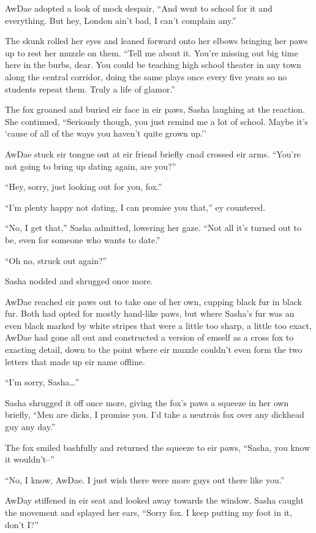 AwDae adopted a look of mock despair, ``And went to school for it and everything.  But hey, London ain't bad, I can't complain any.''

The skunk rolled her eyes and leaned forward onto her elbows bringing her paws up to rest her muzzle on them.  ``Tell me about it.  You're missing out big time here in the burbs, dear.  You could be teaching high school theater in any town along the central corridor, doing the same plays once every five years so no students repeat them.  Truly a life of glamor.''

The fox groaned and buried eir face in eir paws, Sasha laughing at the reaction.  She continued, ``Seriously though, you just remind me a lot of school.  Maybe it's `cause of all of the ways you haven't quite grown up.''

AwDae stuck eir tongue out at eir friend briefly cnad crossed eir arms. ``You're not going to bring up dating again, are you?''

``Hey, sorry, just looking out for you, fox.''

``I'm plenty happy not dating, I can promise you that,'' ey countered.

``No, I get that,'' Sasha admitted, lowering her gaze.  ``Not all it's turned out to be, even for someone who wants to date.''

``Oh no, struck out again?''

Sasha nodded and shrugged once more.

AwDae reached eir paws out to take one of her own, cupping black fur in black fur.  Both had opted for mostly hand-like paws, but where Sasha's fur was an even black marked by white stripes that were a little too sharp, a little too exact, AwDae had gone all out and constructed a version of emself as a cross fox to exacting detail, down to the point where eir muzzle couldn't even form the two letters that made up eir name offline.

``I'm sorry, Sasha\ldots{}''

Sasha shrugged it off once more, giving the fox's paws a squeeze in her own briefly, ``Men are dicks, I promise you.  I'd take a neutrois fox over any dickhead guy any day.''

The fox smiled bashfully and returned the squeeze to eir paws, ``Sasha, you know it wouldn't--''

``No, I know, AwDae.  I just wish there were more guys out there like you.''

AwDay stiffened in eir seat and looked away towards the window.  Sasha caught the movement and splayed her ears, ``Sorry fox.  I keep putting my foot in it, don't I?''

